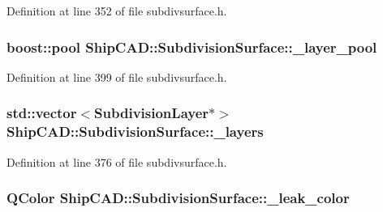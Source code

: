 Definition at line 352 of file subdivsurface.\-h.

\hypertarget{classShipCAD_1_1SubdivisionSurface_a953485df23e6f7393868b436384debef}{
\subsubsection[{\-\_\-layer\-\_\-pool}]{\setlength{\rightskip}{0pt plus 5cm}boost\-::pool Ship\-C\-A\-D\-::\-Subdivision\-Surface\-::\-\_\-layer\-\_\-pool\hspace{0.3cm}{\ttfamily [protected]}}}\label{classShipCAD_1_1SubdivisionSurface_a953485df23e6f7393868b436384debef}


Definition at line 399 of file subdivsurface.\-h.

\hypertarget{classShipCAD_1_1SubdivisionSurface_a87c6c8b63f203d788b8f4b361c814c96}{
\subsubsection[{\-\_\-layers}]{\setlength{\rightskip}{0pt plus 5cm}std\-::vector$<${\bf Subdivision\-Layer}$\ast$$>$ Ship\-C\-A\-D\-::\-Subdivision\-Surface\-::\-\_\-layers\hspace{0.3cm}{\ttfamily [protected]}}}\label{classShipCAD_1_1SubdivisionSurface_a87c6c8b63f203d788b8f4b361c814c96}


Definition at line 376 of file subdivsurface.\-h.

\hypertarget{classShipCAD_1_1SubdivisionSurface_aacd1616b97a4425cc9b1051e01785596}{
\subsubsection[{\-\_\-leak\-\_\-color}]{\setlength{\rightskip}{0pt plus 5cm}Q\-Color Ship\-C\-A\-D\-::\-Subdivision\-Surface\-::\-\_\-leak\-\_\-color\hspace{0.3cm}{\ttfamily [protected]}}}\label{classShipCAD_1_1SubdivisionSurface_aacd1616b97a4425cc9b1051e01785596}


